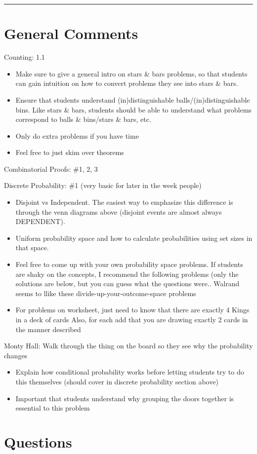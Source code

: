 \documentclass{exam}
\title{}
\date{Berlekamp-Welsh, Countability, Self Reference, Counting}
\begin{document}
\maketitle
\rule{\textwidth}{0.15em}
\fontsize{12}{15}\selectfont
\thispagestyle{empty}


\section{General Comments}
\begin{questions}
  \item Counting: 1.1
    \begin{itemize}
      \item Make sure to give a general intro on stars \& bars problems, so that students can gain intuition on how to convert problems they see into stars \& bars. 
      \item Ensure that students understand (in)distinguishable balls/(in)distinguishable bins. Like stars \& bars, students should be able to understand what problems correspond to balls \& bins/stars \& bars, etc.
      \item Only do extra problems if you have time
      \item Feel free to just skim over theorems
    \end{itemize}
  \item Combinatorial Proofs: \#1, 2, 3
  \item Discrete Probability: \#1 (very basic for later in the week people)
    \begin{itemize}
      \item Disjoint vs Independent. The easiest way to emphasize this difference is through the venn diagrams above (disjoint events are almost always DEPENDENT).
      \item Uniform probability space and how to calculate probabilities using set sizes in that space.
      \item Feel free to come up with your own probability space problems. If students are shaky on the concepts, I recommend the following problems (only the solutions are below, but you can guess what the questions were.. Walrand seems to llike these divide-up-your-outcome-space problems
      \item For problems on worksheet, just need to know that there are exactly 4 Kings in a deck of cards
            Also, for each add that you are drawing exactly 2 cards in the manner described
    \end{itemize}
  \item Monty Hall: Walk through the thing on the board so they see why the probability changes
    \begin{itemize}
      \item Explain how conditional probability works before letting students try to do this themselves (should cover in discrete probability section above)
      \item Important that students understand why grouping the doors together is essential to this problem
    \end{itemize}
\end{questions}

\section{Questions}
\end{document}
